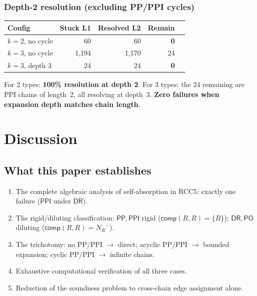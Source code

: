 \documentclass[a4paper,11pt]{article}
\theoremstyle{definition}
\newcommand{\NR}{\ensuremath{N_R}}
\newcommand{\DR}{\ensuremath{\mathsf{DR}}}
\newcommand{\PO}{\ensuremath{\mathsf{PO}}}
\newcommand{\PP}{\ensuremath{\mathsf{PP}}}
\newcommand{\PPI}{\ensuremath{\mathsf{PPI}}}
\newcommand{\comp}{\ensuremath{\mathsf{comp}}}
\begin{document}
\subsubsection{Depth-2 resolution (excluding PP/PPI cycles)}

\begin{center}
\renewcommand{\arraystretch}{1.2}
\begin{tabular}{lrrrr}
\toprule
\textbf{Config} & \textbf{Stuck L1} & \textbf{Resolved L2} & \textbf{Remain} \\
\midrule
$k{=}2$, no cycle & 60 & 60 & \textbf{0} \\
$k{=}3$, no cycle & 1,194 & 1,170 & 24 \\
$k{=}3$, depth 3 & 24 & 24 & \textbf{0} \\
\bottomrule
\end{tabular}
\end{center}

For 2 types: \textbf{100\% resolution at depth 2}.  For 3 types:
the 24 remaining are PPI chains of length~2, all resolving at
depth~3.  \textbf{Zero failures when expansion depth matches chain
length}.


\section{Discussion}
\label{sec:discussion}

\subsection{What this paper establishes}

\begin{enumerate}[nosep]
  \item The complete algebraic analysis of self-absorption in
    RCC5: exactly one failure ($\PPI$ under $\DR$).
  \item The rigid/diluting classification: $\PP, \PPI$ rigid
    ($\comp(R,R) = \{R\}$); $\DR, \PO$ diluting
    ($\comp(R,R) = \NR^{-}$).
  \item The trichotomy: no PP/PPI $\to$ direct; acyclic PP/PPI
    $\to$ bounded expansion; cyclic PP/PPI $\to$ infinite chains.
  \item Exhaustive computational verification of all three cases.
  \item Reduction of the soundness problem to cross-chain edge
    assignment alone.
\end{enumerate}
\end{document}
